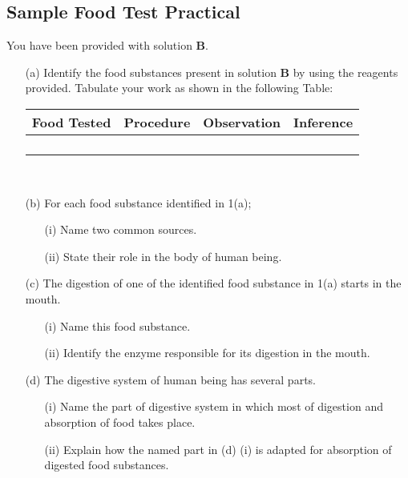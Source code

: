 \subsection{Sample Food Test Practical}
You have been provided with solution \textbf{B}. 

\begin{enumerate}
\item[(a)] Identify the food substances present in solution \textbf{B} by using the reagents provided. Tabulate your work as shown in the following Table:

\begin{center}
\begin{tabular}{|p{3cm}|p{3cm}|p{3cm}|p{3cm}|} \hline
\multicolumn{1}{|c|}{\textbf{Food Tested}}&\multicolumn{1}{c|}{\textbf{Procedure}}&\multicolumn{1}{c|}{\textbf{Observation}}&\multicolumn{1}{c|}{\textbf{Inference}} \\ \hline
&&& \\
&&& \\
&&& \\
&&& \\ \hline
\end{tabular} \\[10pt]
\end{center}

\item[(b)] For each food substance identified in 1(a);
\begin{enumerate}
\item[(i)] Name two common sources.
\item[(ii)] State their role in the body of human being.
\end{enumerate}
\item[(c)] The digestion of one of the identified food substance in 1(a) starts in the mouth.
\begin{enumerate}
\item[(i)] Name this food substance.
\item[(ii)] Identify the enzyme responsible for its digestion in the mouth.
\end{enumerate}
\item[(d)] The digestive system of human being has several parts.
\begin{enumerate}
\item[(i)] Name the part of digestive system in which most of digestion and absorption of food takes place.
\item[(ii)] Explain how the named part in (d) (i) is adapted for absorption of digested food substances.
\end{enumerate}
\end{enumerate}

